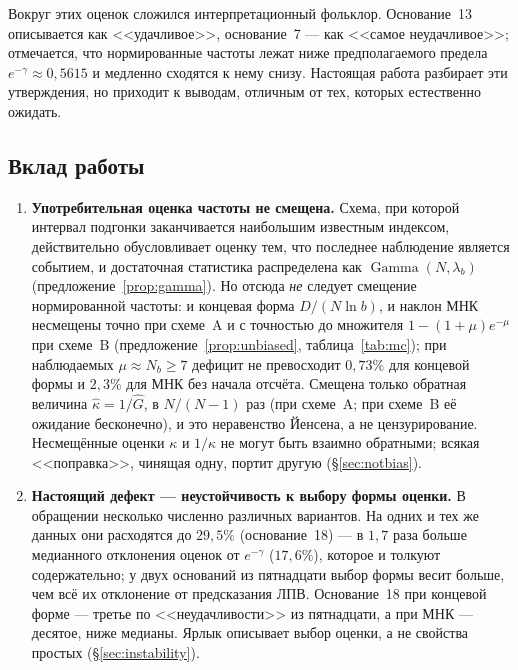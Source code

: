 \documentclass[11pt,a4paper]{article}
\theoremstyle{plain}
\theoremstyle{remark}
\newcommand{\emg}{e^{-\gamma}}
\DeclareMathOperator{\Gam}{Gamma}
\begin{document}
Вокруг этих оценок сложился интерпретационный фольклор. Основание~13 описывается как
<<удачливое>>, основание~7 --- как <<самое неудачливое>>; отмечается, что нормированные
частоты лежат ниже предполагаемого предела $\emg\approx0{,}5615$ и медленно сходятся
к нему снизу. Настоящая работа разбирает эти утверждения, но приходит к выводам,
отличным от тех, которых естественно ожидать.

\subsection{Вклад работы}

\begin{enumerate}
\item\textbf{Употребительная оценка частоты не смещена.} Схема, при которой интервал
подгонки заканчивается наибольшим известным индексом, действительно обусловливает
оценку тем, что последнее наблюдение является событием, и достаточная статистика
распределена как $\Gam(N,\lambda_b)$ (предложение~\ref{prop:gamma}). Но отсюда
\emph{не} следует смещение нормированной частоты: и концевая форма
$D/(N\ln b)$, и наклон МНК несмещены точно при схеме~A и с точностью до
множителя $1-(1+\mu)e^{-\mu}$ при схеме~B (предложение~\ref{prop:unbiased},
таблица~\ref{tab:mc}); при наблюдаемых $\mu\approx N_b\ge7$ дефицит не
превосходит $0{,}73\%$ для концевой формы и $2{,}3\%$ для МНК без начала отсчёта.
Смещена только обратная величина
$\hat\kappa=1/\hat G$, в $N/(N-1)$ раз (при схеме~A; при схеме~B её ожидание
бесконечно), и это неравенство Йенсена, а не цензурирование.
Несмещённые оценки $\kappa$ и $1/\kappa$ не могут быть взаимно обратными; всякая
<<поправка>>, чинящая одну, портит другую (\S\ref{sec:notbias}).

\item\textbf{Настоящий дефект --- неустойчивость к выбору формы оценки.}
В обращении несколько численно различных вариантов. На одних и тех же данных они
расходятся до $29{,}5\%$ (основание~18) --- в $1{,}7$ раза больше медианного
отклонения оценок от $\emg$ ($17{,}6\%$), которое и толкуют содержательно; у двух
оснований из пятнадцати выбор формы весит больше, чем всё их отклонение от
предсказания ЛПВ. Основание~18 при концевой форме --- третье
по <<неудачливости>> из пятнадцати, а при МНК --- десятое, ниже медианы. Ярлык
описывает выбор оценки, а не свойства простых (\S\ref{sec:instability}).


\end{enumerate}
\end{document}
